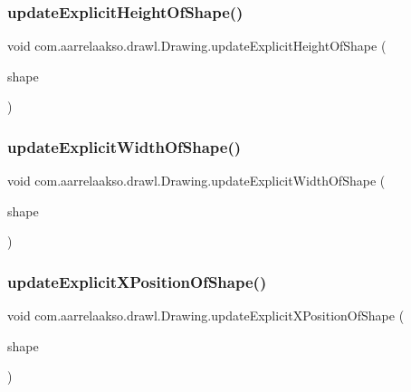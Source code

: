 \subsubsection{\texorpdfstring{update\+Explicit\+Height\+Of\+Shape()}{updateExplicitHeightOfShape()}}
{\footnotesize\ttfamily void com.\+aarrelaakso.\+drawl.\+Drawing.\+update\+Explicit\+Height\+Of\+Shape (\begin{DoxyParamCaption}\item[{@Not\+Null \hyperlink{classcom_1_1aarrelaakso_1_1drawl_1_1_shape}{Shape}}]{shape }\end{DoxyParamCaption})\hspace{0.3cm}{\ttfamily [private]}}

\mbox{\label{classcom_1_1aarrelaakso_1_1drawl_1_1_drawing_a134dd73b431478205eb941ca3a88af7e}} 
\subsubsection{\texorpdfstring{update\+Explicit\+Width\+Of\+Shape()}{updateExplicitWidthOfShape()}}
{\footnotesize\ttfamily void com.\+aarrelaakso.\+drawl.\+Drawing.\+update\+Explicit\+Width\+Of\+Shape (\begin{DoxyParamCaption}\item[{@Not\+Null \hyperlink{classcom_1_1aarrelaakso_1_1drawl_1_1_shape}{Shape}}]{shape }\end{DoxyParamCaption})\hspace{0.3cm}{\ttfamily [private]}}

\mbox{\label{classcom_1_1aarrelaakso_1_1drawl_1_1_drawing_a534b929a2b7e038af13f19b6749c6cdc}} 
\subsubsection{\texorpdfstring{update\+Explicit\+X\+Position\+Of\+Shape()}{updateExplicitXPositionOfShape()}}
{\footnotesize\ttfamily void com.\+aarrelaakso.\+drawl.\+Drawing.\+update\+Explicit\+X\+Position\+Of\+Shape (\begin{DoxyParamCaption}\item[{@Not\+Null \hyperlink{classcom_1_1aarrelaakso_1_1drawl_1_1_shape}{Shape}}]{shape }\end{DoxyParamCaption})\hspace{0.3cm}{\ttfamily [private]}}

